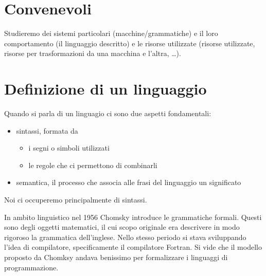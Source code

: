 \documentclass[12pt]{article}
\begin{document}
\tableofcontents
\newpage

\section{Convenevoli}
Studieremo dei sistemi particolari (macchine/grammatiche) e il loro comportamento (il linguaggio descritto) e le risorse utilizzate (risorse utilizzate, risorse per trasformazioni da una macchina e l'altra, \dots). 

\section{Definizione di un linguaggio}
Quando si parla di un linguagio ci sono due aspetti fondamentali:
\begin{itemize}
	\item sintassi, formata da
	\begin{itemize}
		\item i segni o simboli utilizzati
		\item le regole che ci permettono di combinarli
	\end{itemize}
	\item semantica, il processo che associa alle frasi del linguaggio un significato
\end{itemize}

Noi ci occuperemo principalmente di sintassi.

In ambito linguistico nel 1956 Chomsky introduce le grammatiche formali.
Questi sono degli oggetti matematici, il cui scopo originale era descrivere in modo rigoroso la grammatica dell'inglese.
Nello stesso periodo si stava sviluppando l'idea di compilatore, specificamente il compilatore Fortran.
Si vide che il modello proposto da Chomksy andava benissimo per formalizzare i linguaggi di programmazione.
\end{document}
